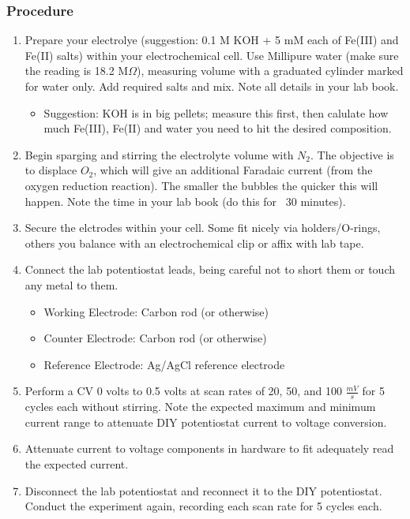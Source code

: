 \documentclass{article}
\begin{document}
\subsubsection*{Procedure}
\begin{enumerate}
  \item Prepare your electrolye (suggestion: 0.1 M KOH + 5 mM each of Fe(III) and Fe(II) salts) within your electrochemical cell. Use Millipure water (make sure the reading is 18.2 M$\Omega$), measuring volume with a graduated cylinder marked for water only. Add required salts and mix. Note all details in your lab book.
  \begin{itemize}
    \item Suggestion: KOH is in big pellets; measure this first, then calulate how much Fe(III), Fe(II) and water you need to hit the desired composition.
  \end{itemize}
  \item Begin sparging and stirring the electrolyte volume with $N_2$. The objective is to displace $O_2$, which will give an additional Faradaic current (from the oxygen reduction reaction). The smaller the bubbles the quicker this will happen. Note the time in your lab book (do this for ~30 minutes).
  \item Secure the elctrodes within your cell. Some fit nicely via holders/O-rings, others you balance with an electrochemical clip or affix with lab tape.
  \item Connect the lab potentiostat leads, being careful not to short them or touch any metal to them.
  \begin{itemize}
    \item Working Electrode: Carbon rod (or otherwise)
    \item Counter Electrode: Carbon rod (or otherwise)
    \item Reference Electrode: Ag/AgCl reference electrode
  \end{itemize}
  \item Perform a CV 0 volts to 0.5 volts at scan rates of 20, 50, and 100 $\frac{mV}{s}$ for 5 cycles each without stirring. Note the expected maximum and minimum current range to attenuate DIY potentiostat current to voltage conversion.
  \item Attenuate current to voltage components in hardware to fit adequately read the expected current. 
  \item Disconnect the lab potentiostat and reconnect it to the DIY potentiostat. Conduct the experiment again, recording each scan rate for 5 cycles each.
\end{enumerate}
\end{document}

